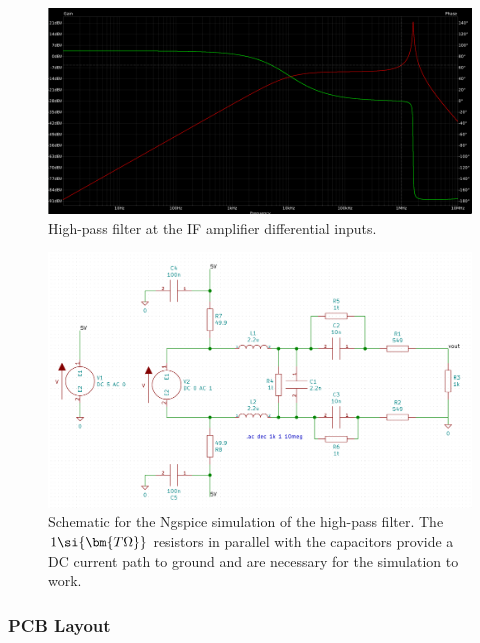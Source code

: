 \begin{figure}[h]
        \centering
        \includegraphics[width=\textwidth]{data/mixer-if-amp-filter}
        \caption{High-pass filter at the IF amplifier differential inputs.}
        \label{fig:mixer-if-amp-filter}
\end{figure}

\begin{figure}[h]
        \centering
        \includegraphics[width=\textwidth]{data/mixer-if-amp-filter-schematic}
        \caption{Schematic for the Ngspice simulation of the high-pass filter. The
          $1 \si{\protect\bm{T\Omega}}$ resistors in parallel with the capacitors provide a DC
          current path to ground and are necessary for the simulation to work.}
        \label{fig:mixer-if-amp-filter-schematic}
\end{figure}

\subsubsection{PCB Layout}
\label{sec:ada4940-2-pcb}

